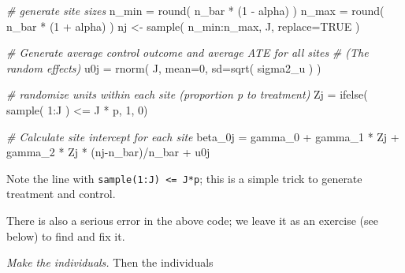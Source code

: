\documentclass[
]{book}
\newenvironment{Shaded}{\begin{snugshade}}{\end{snugshade}}
\newcommand{\AttributeTok}[1]{\textcolor[rgb]{0.77,0.63,0.00}{#1}}
\newcommand{\CommentTok}[1]{\textcolor[rgb]{0.56,0.35,0.01}{\textit{#1}}}
\newcommand{\ConstantTok}[1]{\textcolor[rgb]{0.00,0.00,0.00}{#1}}
\newcommand{\DecValTok}[1]{\textcolor[rgb]{0.00,0.00,0.81}{#1}}
\newcommand{\FunctionTok}[1]{\textcolor[rgb]{0.00,0.00,0.00}{#1}}
\newcommand{\NormalTok}[1]{#1}
\newcommand{\OtherTok}[1]{\textcolor[rgb]{0.56,0.35,0.01}{#1}}
\newcommand{\SpecialCharTok}[1]{\textcolor[rgb]{0.00,0.00,0.00}{#1}}
\begin{document}
\begin{Shaded}
\begin{Highlighting}[]
  \CommentTok{\# generate site sizes }
\NormalTok{  n\_min }\OtherTok{=} \FunctionTok{round}\NormalTok{( n\_bar }\SpecialCharTok{*}\NormalTok{ (}\DecValTok{1} \SpecialCharTok{{-}}\NormalTok{ alpha) )}
\NormalTok{  n\_max }\OtherTok{=} \FunctionTok{round}\NormalTok{( n\_bar }\SpecialCharTok{*}\NormalTok{ (}\DecValTok{1} \SpecialCharTok{+}\NormalTok{ alpha) )}
\NormalTok{  nj }\OtherTok{\textless{}{-}} \FunctionTok{sample}\NormalTok{( n\_min}\SpecialCharTok{:}\NormalTok{n\_max, J, }\AttributeTok{replace=}\ConstantTok{TRUE}\NormalTok{ )}

  \CommentTok{\# Generate average control outcome and average ATE for all sites}
  \CommentTok{\# (The random effects)}
\NormalTok{  u0j }\OtherTok{=} \FunctionTok{rnorm}\NormalTok{( J, }\AttributeTok{mean=}\DecValTok{0}\NormalTok{, }\AttributeTok{sd=}\FunctionTok{sqrt}\NormalTok{( sigma2\_u ) )}
  
  \CommentTok{\# randomize units within each site (proportion p to treatment)}
\NormalTok{  Zj }\OtherTok{=} \FunctionTok{ifelse}\NormalTok{( }\FunctionTok{sample}\NormalTok{( }\DecValTok{1}\SpecialCharTok{:}\NormalTok{J ) }\SpecialCharTok{\textless{}=}\NormalTok{ J }\SpecialCharTok{*}\NormalTok{ p, }\DecValTok{1}\NormalTok{, }\DecValTok{0}\NormalTok{)}
  
  \CommentTok{\# Calculate site intercept for each site}
\NormalTok{  beta\_0j }\OtherTok{=}\NormalTok{ gamma\_0 }\SpecialCharTok{+}\NormalTok{ gamma\_1 }\SpecialCharTok{*}\NormalTok{ Zj }\SpecialCharTok{+}\NormalTok{ gamma\_2 }\SpecialCharTok{*}\NormalTok{ Zj }\SpecialCharTok{*}\NormalTok{ (nj}\SpecialCharTok{{-}}\NormalTok{n\_bar)}\SpecialCharTok{/}\NormalTok{n\_bar }\SpecialCharTok{+}\NormalTok{ u0j}
\end{Highlighting}
\end{Shaded}

Note the line with \texttt{sample(1:J)\ \textless{}=\ J*p}; this is a simple trick to generate treatment and control.

There is also a serious error in the above code; we leave it as an exercise (see below) to find and fix it.

\emph{Make the individuals.}
Then the individuals
\end{document}
